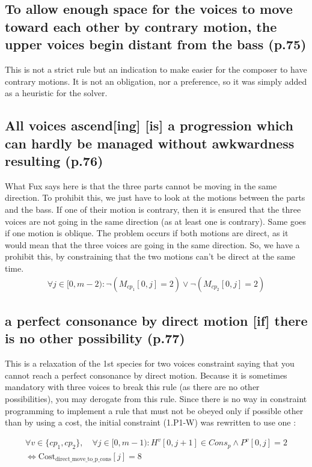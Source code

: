 \subsection{\reddot To allow enough space for the voices to move toward each other by contrary motion, the upper voices begin distant from the bass (p.75)}
This is not a strict rule but an indication to make easier for the composer to have contrary motions. It is not an obligation, nor a preference, so it was simply added as a heuristic for the solver.

\subsection{\reddot All voices ascend[ing] [is] a progression which can hardly be managed without awkwardness resulting (p.76)}
What Fux says here is that the three parts cannot be moving in the same direction. 
To prohibit this, we just have to look at the motions between the parts and the bass. If one of their motion is contrary, then it is ensured that the three voices are not going in the same direction (as at least one is contrary). Same goes if one motion is oblique. The problem occurs if both motions are direct, as it would mean that the three voices are going in the same direction. So, we have a prohibit this, by constraining that the two motions can't be direct at the same time. 
\begin{equation} \begin{aligned}
 \forall j \in [0, m-2) \colon \neg (M_{cp_1}[0, j] = 2) \lor \neg (M_{cp_2}[0, j] = 2)
\end{aligned} \end{equation}

\subsection{ a perfect consonance by direct motion [if] there is no other possibility (p.77)}
This is a relaxation of the 1st species for two voices constraint saying that you cannot reach a perfect consonance by direct motion. Because it is sometimes mandatory with three voices to break this rule (as there are no other possibilities), you may derogate from this rule. Since there is no way in constraint programming to implement a rule that must not be obeyed only if possible other 
than by using a cost, the initial constraint (1.P1-W)  was rewritten to use one :

\begin{equation} \begin{aligned}
\forall v \in \{cp_1, cp_2\}, \quad \forall j \in [0, m-1) : H^{v}[0, j+1] \in Cons_{p} \land P^{v}[0, j] = 2 \\
\iff \text{{Cost}}_{\text{{direct\_move\_to\_p\_cons}}}[j] = 8
\end{aligned} \end{equation}

